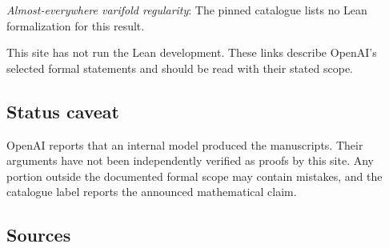 \documentclass[11pt]{article}
\begin{document}
\textit{Almost-everywhere varifold regularity}: The pinned catalogue lists no Lean formalization for this result.

This site has not run the Lean development. These links describe OpenAI’s selected formal statements and should be read with their stated scope.

\subsection{Status caveat}
OpenAI reports that an internal model produced the manuscripts. Their arguments have not been independently verified as proofs by this site. Any portion outside the documented formal scope may contain mistakes, and the catalogue label reports the announced mathematical claim.

\subsection{Sources}
\end{document}
